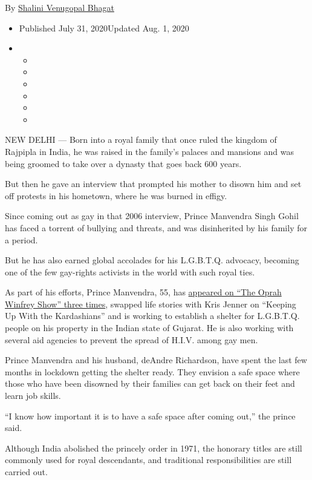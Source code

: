 By \href{https://www.nytimes.com/by/shalini-venugopal-bhagat}{Shalini
Venugopal Bhagat}

\begin{itemize}
\item
  Published July 31, 2020Updated Aug. 1, 2020
\item
  \begin{itemize}
  \item
  \item
  \item
  \item
  \item
  \item
  \end{itemize}
\end{itemize}

NEW DELHI --- Born into a royal family that once ruled the kingdom of
Rajpipla in India, he was raised in the family's palaces and mansions
and was being groomed to take over a dynasty that goes back 600 years.

But then he gave an interview that prompted his mother to disown him and
set off protests in his hometown, where he was burned in effigy.

Since coming out as gay in that 2006 interview, Prince Manvendra Singh
Gohil has faced a torrent of bullying and threats, and was disinherited
by his family for a period.

But he has also earned global accolades for his L.G.B.T.Q. advocacy,
becoming one of the few gay-rights activists in the world with such
royal ties.

As part of his efforts, Prince Manvendra, 55, has
\href{https://www.youtube.com/watch?v=i6a39D0PtPM}{appeared on ``The
Oprah Winfrey Show'' three times}, swapped life stories with Kris Jenner
on ``Keeping Up With the Kardashians'' and is working to establish a
shelter for L.G.B.T.Q. people on his property in the Indian state of
Gujarat. He is also working with several aid agencies to prevent the
spread of H.I.V. among gay men.

Prince Manvendra and his husband, deAndre Richardson, have spent the
last few months in lockdown getting the shelter ready. They envision a
safe space where those who have been disowned by their families can get
back on their feet and learn job skills.

``I know how important it is to have a safe space after coming out,''
the prince said.

Although India abolished the princely order in 1971, the honorary titles
are still commonly used for royal descendants, and traditional
responsibilities are still carried out.

